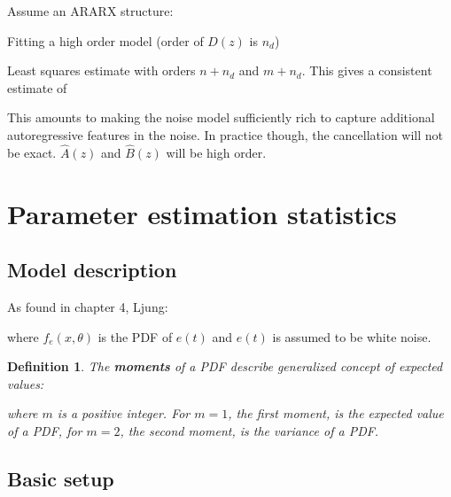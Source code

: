 \documentclass[10pt,a4paper]{scrartcl}
\newtheorem{define}{Definition}
\begin{document}
\begin{multicols*}{2}
Assume an ARARX structure:


Fitting a high order model (order of $D(z)$ is $n_d$)


Least squares estimate with orders $n+n_d$ and $m+n_d$. This gives a consistent estimate of 


This amounts to making the noise model sufficiently rich to capture additional autoregressive features in the noise. In practice though, the cancellation will not be exact. $\hat{A}(z)$ and $\hat{B}(z)$ will be high order.

\section{Parameter estimation statistics}

\subsection{Model description}

As found in chapter 4, Ljung:


where $f_e(x,\theta)$ is the PDF of $e(t)$ and $e(t)$ is assumed to be white noise.

\begin{define}
The \textbf{moments} of a PDF describe generalized concept of expected values:


where $m$ is a positive integer. For $m=1$, the first moment, is the expected value of a PDF, for $m=2$, the second moment, is the variance of a PDF.
\end{define}

\subsection{Basic setup}




\end{multicols*}
\end{document}

